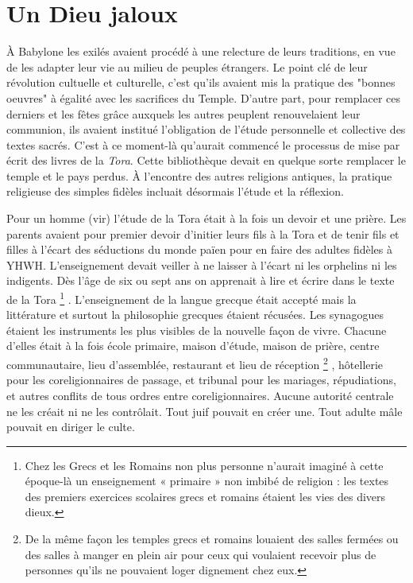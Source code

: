 \section{Un Dieu jaloux}

 À Babylone les exilés avaient procédé à une relecture de leurs traditions, en vue de les adapter leur vie au milieu de peuples étrangers. Le point clé de leur révolution cultuelle et culturelle, c'est qu'ils avaient mis la pratique des "bonnes oeuvres" à égalité avec les sacrifices du Temple. D'autre part, pour remplacer ces derniers et les fêtes grâce auxquels les autres peuplent renouvelaient leur communion, ils avaient institué l'obligation de l'étude personnelle et collective des textes sacrés. C'est à ce moment-là qu'aurait commencé le processus de mise par écrit des livres de la \emph{Tora}. Cette bibliothèque devait en quelque sorte remplacer le temple et le pays perdus. À l'encontre des autres religions antiques, la pratique religieuse des simples fidèles incluait désormais l'étude et la réflexion. 

 Pour un homme (vir) l'étude de la Tora était à la fois un devoir et une prière. Les parents avaient pour premier devoir d'initier leurs fils à la Tora et de tenir fils et filles à l'écart des séductions du monde païen pour en faire des adultes fidèles à YHWH. L'enseignement devait veiller à ne laisser à l'écart ni les orphelins ni les indigents. Dès l'âge de six ou sept ans on apprenait à lire et écrire dans le texte de la Tora%
\footnote{Chez les Grecs et les Romains non plus personne n'aurait imaginé à cette époque-là un enseignement « primaire » non imbibé de religion : les textes des premiers exercices scolaires grecs et romains étaient les vies des divers dieux.}%
. L'enseignement de la langue grecque était accepté mais la littérature et surtout la philosophie grecques étaient récusées. 
Les synagogues étaient les instruments les plus visibles de la nouvelle façon de vivre. Chacune d'elles était à la fois école primaire, maison d'étude, maison de prière, centre communautaire, lieu d'assemblée, restaurant et lieu de réception%
\footnote{De la même façon les temples grecs et romains louaient des salles fermées ou des salles à manger en plein air pour ceux qui voulaient recevoir plus de personnes qu'ils ne pouvaient loger dignement chez eux.}%
, hôtellerie pour les coreligionnaires de passage, et tribunal pour les mariages, répudiations, et autres conflits de tous ordres entre coreligionnaires. Aucune autorité centrale ne les créait ni ne les contrôlait. Tout juif pouvait en créer une. Tout adulte mâle pouvait en diriger le culte.



